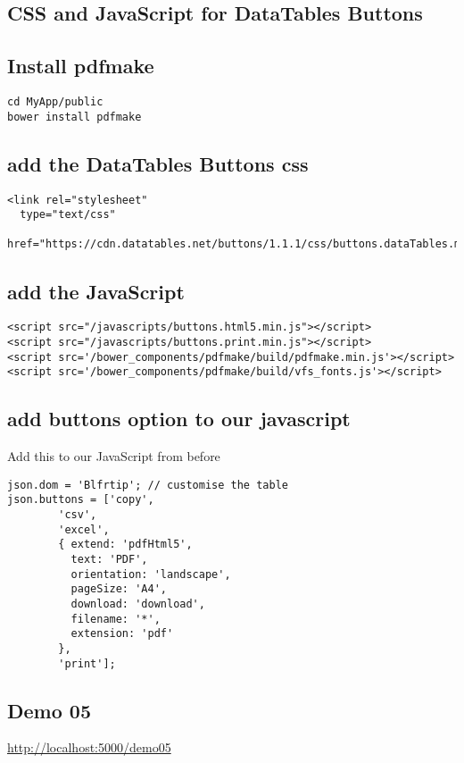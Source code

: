 \documentclass[11pt]{article}
\begin{document}
\subsection*{CSS and JavaScript for DataTables Buttons}
\label{sec:orgheadline30}
\subsection*{Install pdfmake}
\label{sec:orgheadline31}
\begin{verbatim}
cd MyApp/public
bower install pdfmake
\end{verbatim}

\subsection*{add the DataTables Buttons css}
\label{sec:orgheadline32}
\begin{verbatim}
<link rel="stylesheet" 
  type="text/css" 
  href="https://cdn.datatables.net/buttons/1.1.1/css/buttons.dataTables.min.css">
\end{verbatim}

\subsection*{add the JavaScript}
\label{sec:orgheadline33}
\begin{verbatim}
<script src="/javascripts/buttons.html5.min.js"></script>
<script src="/javascripts/buttons.print.min.js"></script>
<script src='/bower_components/pdfmake/build/pdfmake.min.js'></script>
<script src='/bower_components/pdfmake/build/vfs_fonts.js'></script>
\end{verbatim}
\subsection*{add buttons option to our javascript}
\label{sec:orgheadline34}
Add this to our JavaScript from before
\begin{verbatim}
json.dom = 'Blfrtip'; // customise the table
json.buttons = ['copy',
		'csv',
		'excel',
		{ extend: 'pdfHtml5',
		  text: 'PDF',
		  orientation: 'landscape',
		  pageSize: 'A4',
		  download: 'download',
		  filename: '*',
		  extension: 'pdf'
		},
		'print'];
\end{verbatim}
\subsection*{Demo 05}
\label{sec:orgheadline35}
\url{http://localhost:5000/demo05}
\end{document}
